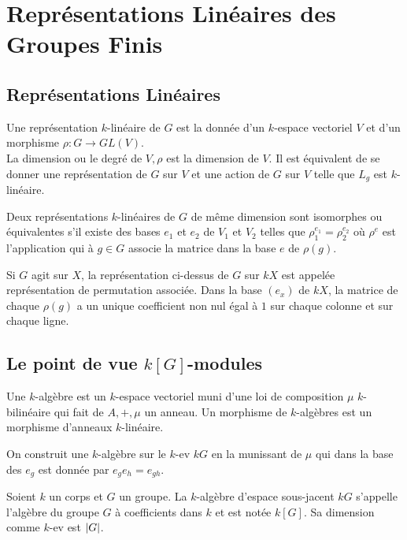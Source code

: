 \documentclass{cours}
\begin{document}
\section{Représentations Linéaires des Groupes Finis}
\subsection{Représentations Linéaires}
\begin{definition}
    Une représentation $k$-linéaire de $G$ est la donnée d'un $k$-espace vectoriel $V$ et d'un morphisme $\rho : G \rightarrow GL(V)$.\\
    La dimension ou le degré de $V, \rho$ est la dimension de $V$. Il est équivalent de se donner une représentation de $G$ sur $V$ et une action de $G$ sur $V$ telle que $L_{g}$ est $k$-linéaire.
\end{definition}

\begin{definition}
    Deux représentations $k$-linéaires de $G$ de même dimension sont isomorphes ou équivalentes s'il existe des bases $e_{1}$ et $e_{2}$ de $V_{1}$ et $V_{2}$ telles que $\rho_{1}^{e_{1}} = \rho_{2}^{e_{2}}$ où $\rho^{e}$ est l'application qui à $g \in G$ associe la matrice dans la base $e$ de $\rho(g)$.
\end{definition}

\begin{definition}
    Si $G$ agit sur $X$, la représentation ci-dessus de $G$ sur $kX$ est appelée représentation de permutation associée. Dans la base $(e_{x})$ de $kX$, la matrice de chaque $\rho(g)$ a un unique coefficient non nul égal à $1$ sur chaque colonne et sur chaque ligne.
\end{definition}

\subsection{Le point de vue $k[G]$-modules}
\begin{definition}
    Une $k$-algèbre est un $k$-espace vectoriel muni d'une loi de composition $\mu$ $k$-bilinéaire qui fait de $A, +, \mu$ un anneau. Un morphisme de $k$-algèbres est un morphisme d'anneaux $k$-linéaire.
\end{definition}

On construit une $k$-algèbre sur le $k$-ev $kG$ en la munissant de $\mu$ qui dans la base des $e_{g}$ est donnée par $e_{g}e_{h} = e_{gh}$.

\begin{definition}
    Soient $k$ un corps et $G$ un groupe. La $k$-algèbre d'espace sous-jacent $kG$ s'appelle l'algèbre du groupe $G$ à coefficients dans $k$ et est notée $k[G]$. Sa dimension comme $k$-ev est $\left|G\right|$.
\end{definition}
\end{document}
